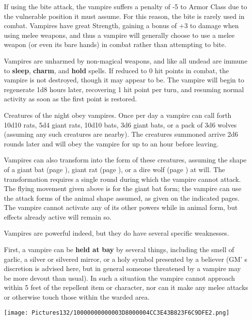 \documentclass[a4paper,twoside,openany,10pt]{book}
\begin{document}
\begin{multicols}{2}
If using the bite attack, the vampire suffers a penalty of -5 to Armor Class due to the vulnerable position it must assume. For this reason, the bite is rarely used in combat. Vampires have great Strength, gaining a bonus of +3 to damage when using melee weapons, and thus a vampire will generally choose to use a melee weapon (or even its bare hands) in combat rather than attempting to bite.

Vampires are unharmed by non-magical weapons, and like all undead are immune to \textbf{sleep}, \textbf{charm},\textbf{ }and \textbf{hold }spells. If reduced to 0 hit points in combat, the vampire is not destroyed, though it may appear to be. The vampire will begin to regenerate 1d8 hours later, recovering 1 hit point per turn, and resuming normal activity as soon as the first point is restored.

Creatures of the night obey vampires. Once per day a vampire can call forth 10d10 rats, 5d4 giant rats, 10d10 bats, 3d6 giant bats, or a pack of 3d6 wolves (assuming any such creatures are nearby). The creatures summoned arrive 2d6 rounds later and will obey the vampire for up to an hour before leaving. 

Vampires can also transform into the form of these creatures, assuming the shape of a giant bat (page \hyperlink{bat-and-bat-giant}{\pageref{bat-and-bat-giant}}), giant rat (page \hyperlink{rat-and-rat-giant}{\pageref{rat-and-rat-giant}}), or a dire wolf (page \hyperlink{wolf-and-wolf-dire}{\pageref{wolf-and-wolf-dire}}) at will. The transformation requires a single round during which the vampire cannot attack. The flying movement given above is for the giant bat form; the vampire can use the attack forms of the animal shape assumed, as given on the indicated pages. The vampire cannot activate any of its other powers while in animal form, but effects already active will remain so. 

Vampires are powerful indeed, but they do have several specific weaknesses.

First, a vampire can be \textbf{held at bay} by several things, including the smell of garlic, a silver or silvered mirror, or a holy symbol presented by a believer (GM' s discretion is advised here, but in general someone threatened by a vampire may be more devout than usual). In such a situation the vampire cannot approach within 5 feet of the repellent item or character, nor can it make any melee attacks or otherwise touch those within the warded area. 

\begin{center} \texttt{[image: Pictures132/10000000000003D8000004CC3E43B823F6C9DFE2.png]} \end{center}


\end{multicols}
\end{document}
